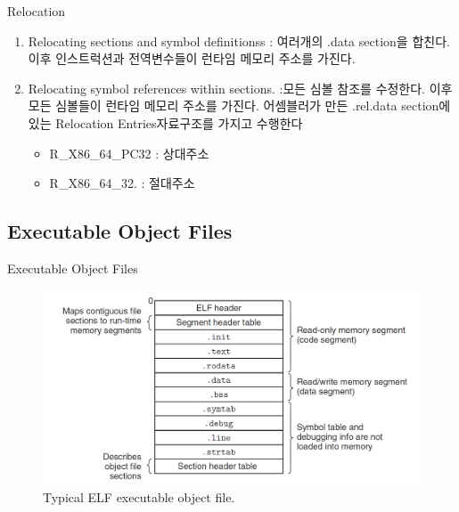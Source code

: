 \documentclass[10pt]{beamer}
\begin{document}
\begin{frame}{Relocation}
    \begin{enumerate}
        \item Relocating sections and symbol definitionss :  여러개의 .data section을 합친다. 이후 인스트럭션과 전역변수들이 런타임 메모리 주소를 가진다.
        \item Relocating symbol references within sections. :모든 심볼 참조를 수정한다. 이후  
        모든 심볼들이 런타임 메모리 주소를 가진다. 어셈블러가 만든 .rel.data section에 있는 Relocation Entries자료구조를 가지고 수행한다
        \begin{itemize}
            \item R\_X86\_64\_PC32 : 상대주소
            \item R\_X86\_64\_32. : 절대주소
        \end{itemize}
    \end{enumerate}
\end{frame} 

\subsection{Executable Object Files}

\begin{frame}{Executable Object Files}
    \begin{figure}[h!]
        \includegraphics[scale=0.25]{pic4}
        \caption{Typical ELF executable object file.}
    \end{figure}
\end{frame}    
\end{document}
